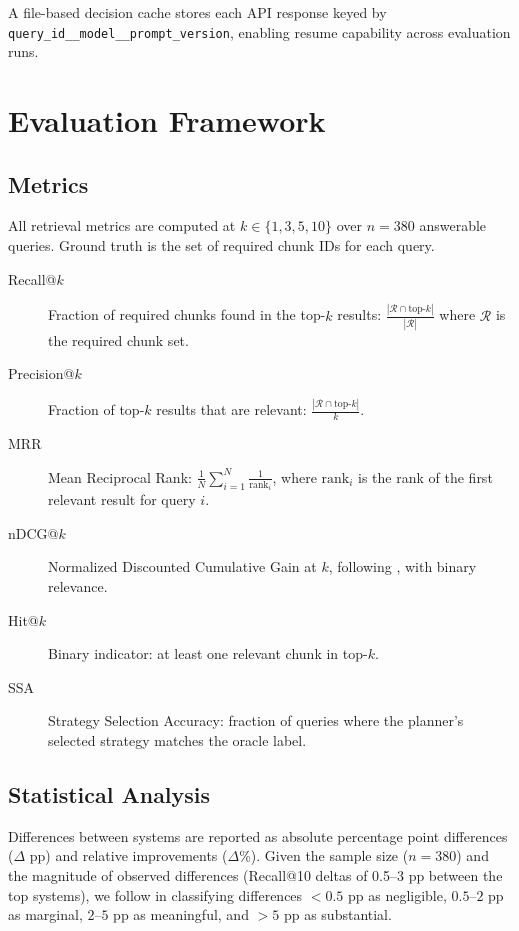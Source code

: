 A file-based decision cache stores each API response keyed by \texttt{query\_id\_\_model\_\_prompt\_version}, enabling resume capability across evaluation runs.

\section{Evaluation Framework}
\label{sec:method_eval}

\subsection{Metrics}

All retrieval metrics are computed at $k \in \{1, 3, 5, 10\}$ over $n{=}380$ answerable queries. Ground truth is the set of required chunk IDs for each query.

\begin{description}
    \item[Recall@$k$] Fraction of required chunks found in the top-$k$ results: $\frac{|\mathcal{R} \cap \text{top-}k|}{|\mathcal{R}|}$ where $\mathcal{R}$ is the required chunk set.
    \item[Precision@$k$] Fraction of top-$k$ results that are relevant: $\frac{|\mathcal{R} \cap \text{top-}k|}{k}$.
    \item[MRR] Mean Reciprocal Rank: $\frac{1}{N}\sum_{i=1}^{N}\frac{1}{\text{rank}_i}$, where $\text{rank}_i$ is the rank of the first relevant result for query $i$.
    \item[nDCG@$k$] Normalized Discounted Cumulative Gain at $k$, following \citet{jaervelin2002ndcg}, with binary relevance.
    \item[Hit@$k$] Binary indicator: at least one relevant chunk in top-$k$.
    \item[SSA] Strategy Selection Accuracy: fraction of queries where the planner's selected strategy matches the oracle label.
\end{description}

\subsection{Statistical Analysis}

Differences between systems are reported as absolute percentage point differences ($\Delta$ pp) and relative improvements ($\Delta$\%). Given the sample size ($n{=}380$) and the magnitude of observed differences (Recall@10 deltas of 0.5--3 pp between the top systems), we follow \citet{manning2008ir} in classifying differences $<{0.5}$ pp as negligible, $0.5$--$2$ pp as marginal, $2$--$5$ pp as meaningful, and $>{5}$ pp as substantial.

